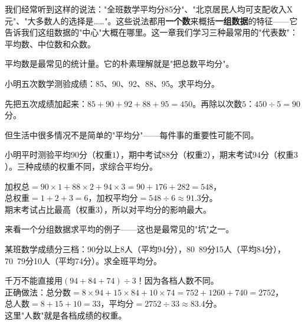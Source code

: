 
我们经常听到这样的说法："全班数学平均分85分"、"北京居民人均可支配收入X元"、"大多数人的选择是……"。这些说法都用\textbf{一个数}来概括\textbf{一组数据}的特征——它告诉我们这组数据的"中心"大概在哪里。这一章我们学习三种最常用的"代表数"：平均数、中位数和众数。


平均数是最常见的统计量。它的朴素理解就是"把总数平均分"。

\begin{example}
小明五次数学测验成绩：85、90、92、88、95。求平均分。
\end{example}
\begin{solution}
先把五次成绩加起来：$85+90+92+88+95=450$。再除以次数$5$：$450\div5=90$分。
\end{solution}

但生活中很多情况不是简单的"平均分"——每件事的重要性可能不同。

\begin{example}
小明平时测验平均$90$分（权重$1$），期中考试$88$分（权重$2$），期末考试$94$分（权重$3$）。三种成绩的权重不同，求综合平均分。
\end{example}
\begin{solution}
加权总$=90\times1+88\times2+94\times3=90+176+282=548$，\\
总权重$=1+2+3=6$，加权平均分$=548\div6\approx91.3$分。\\
期末考试占比最高（权重$3$），所以对平均分的影响最大。
\end{solution}


来看一个分组数据求平均的例子——这也是最常见的"坑"之一。

\begin{example}
某班数学成绩分三档：90分以上8人（平均94分），80~89分15人（平均84分），70~79分10人（平均74分）。求全班平均分。
\end{example}
\begin{solution}
千万不能直接用$(94+84+74)\div3$！因为各档人数不同。\\
正确做法：总分数$=8\times94+15\times84+10\times74=752+1260+740=2752$，\\
总人数$=8+15+10=33$，平均分$=2752\div33\approx83.4$分。\\
这里"人数"就是各档成绩的权重。
\end{solution}

